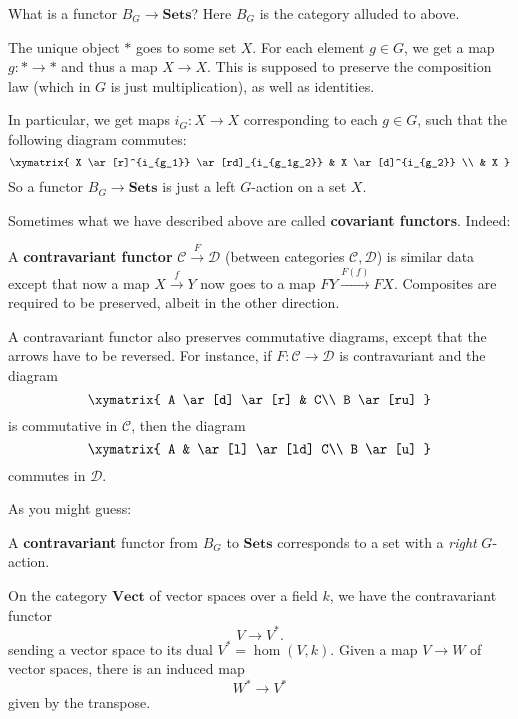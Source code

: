 \begin{example}
What is a functor $B_G \stackrel{}{\to} \mathbf{Sets}$? Here $B_G$ is the
category alluded to above.

The unique object $\ast$ goes to some set $X$. For each element $g \in G$, we
get a map $g: \ast \to \ast$ and thus a map $X \to X$. This is supposed to
preserve the composition law (which in $G$ is just multiplication), as well as
identities.

In particular, we get maps $i_G: X \to X$ corresponding to each $g \in G$, such
that the following diagram commutes:
\[ \xymatrix{
X \ar[r]^{i_{g_1}} \ar[rd]_{i_{g_1g_2}} & X \ar[d]^{i_{g_2}} \\ & X
}\]
So a functor $B_G \to \mathbf{Sets}$ is just a left $G$-action on a set $X$.
\end{example}

Sometimes what we have described above are called \textbf{covariant functors}. Indeed:

\begin{definition}
A \textbf{contravariant functor}  $\mathcal{C}
\stackrel{F}{\to}\mathcal{D}$ (between categories $\mathcal{C}, \mathcal{D}$) is similar
data except that now a map $X \stackrel{f}{\to} Y$ now goes to a map $FY
\stackrel{F(f)}{\to} FX$. Composites
are required to be preserved, albeit in the other direction.
\end{definition}

A contravariant functor also preserves commutative diagrams, except that the
arrows have to be reversed. For instance, if $F: \mathcal{C} \to \mathcal{D}$
is contravariant and the diagram
\[ \xymatrix{
A \ar[d] \ar[r] &  C\\
B \ar[ru]
}\]
is commutative in $\mathcal{C}$, then the diagram
\[ \xymatrix{
A   & \ar[l] \ar[ld] C\\
B \ar[u] 
}\]
commutes in $\mathcal{D}$.

As you might guess:

\begin{example}
A \textbf{contravariant} functor from $B_G$ to $\mathbf{Sets}$ corresponds to a
set with a \emph{right} $G$-action.
\end{example}

\begin{example}
On the category $\mathbf{Vect}$ of vector spaces over a field $k$, we
have
the contravariant functor
\[ V \to V^{\ast}.  \]
sending a vector space to its dual $V^{\ast} = \hom(V,k)$.
Given a map $V \to W$ of vector spaces, there is an induced map
\[ W^{\ast} \to V^{\ast}  \]
given by the transpose.
\end{example}

